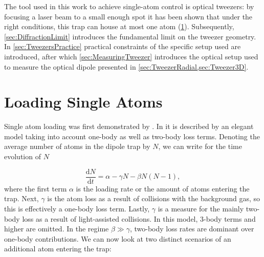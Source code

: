 The tool used in this work to achieve single-atom control is optical tweezers: by focusing a laser beam to a small enough spot it has been shown that under the right conditions, this trap can house at most one atom (\cref{sec:LoadingAtoms}).
Subsequently, \cref{sec:DiffractionLimit} introduces the fundamental limit on the tweezer geometry. 
In \cref{sec:TweezersPractice} practical constraints of the specific setup used are introduced, after which \cref{sec:MeasuringTweezer} introduces the optical setup used to measure the optical dipole presented in \cref{sec:TweezerRadial,sec:Tweezer3D}.

\section{Loading Single Atoms}\label{sec:LoadingAtoms}

Single atom loading was first demonstrated by \cite{Schlosser2001}.
In \cite{Schlosser2002} it is described by an elegant model taking into account one-body as well as two-body loss terms. 
Denoting the average number of atoms in the dipole trap by $N$, we can write for the time evolution of $N$ \cite{Schlosser2002} 

\begin{equation}\label{LoadingTweezer}
	\frac{\text{d}N}{\text{d}t} = \alpha - \gamma N - \beta N(N-1),
\end{equation}
where the first term $\alpha$ is the loading rate or the amount of atoms entering the trap.
Next, $\gamma$ is the atom loss as a result of collisions with the background gas, so this is effectively a one-body loss term.
Lastly, $\gamma$ is a measure for the mainly two-body loss as a result of light-assisted collisions.
In this model, 3-body terms and higher are omitted.
In the regime $\beta \gg \gamma$, two-body loss rates are dominant over one-body contributions. 
We can now look at two distinct scenarios of an additional atom entering the trap:

